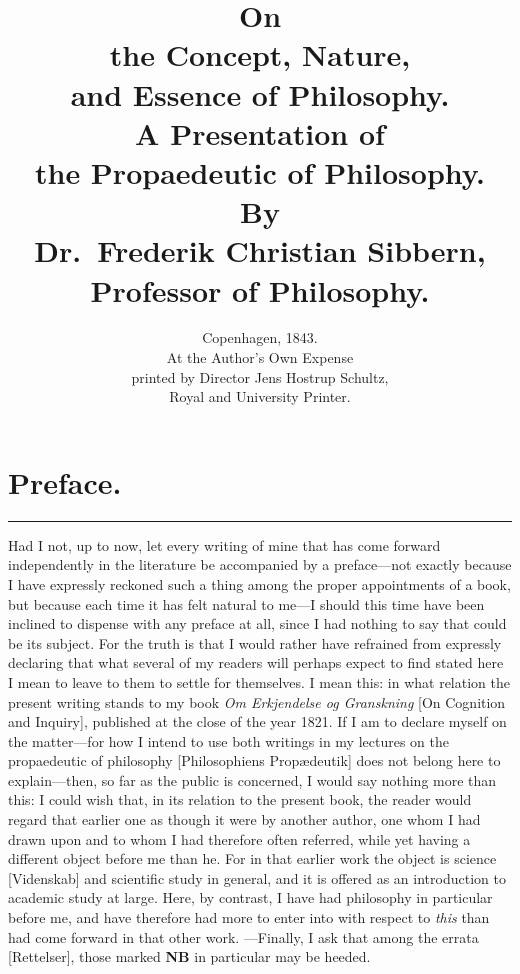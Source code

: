 \documentclass[12pt,a4paper]{book}
\title{\textbf{On}\\[6pt]
  \Huge\textbf{the Concept, Nature,}\\[6pt]
  \LARGE\textbf{and Essence of Philosophy.}\\[14pt]
  \normalsize A Presentation of\\[4pt]
  \Large\textbf{the Propaedeutic of Philosophy.}\\[16pt]
  \normalsize By\\[6pt]
  \large Dr.\ Frederik Christian Sibbern,\\[4pt]
  \normalsize Professor of Philosophy.}
\author{}
\date{Copenhagen, 1843.\\
  At the Author's Own Expense\\
  printed by Director Jens Hostrup Schultz,\\
  Royal and University Printer.}
\begin{document}
\maketitle
\thispagestyle{empty}
\cleardoublepage

\chapter*{Preface.}

\begin{center}\rule{0.28\linewidth}{0.4pt}\end{center}

Had I not, up to now, let every writing of mine that has come forward
independently in the literature be accompanied by a preface---not exactly
because I have expressly reckoned such a thing among the proper appointments of
a book, but because each time it has felt natural to me---I should this time
have been inclined to dispense with any preface at all, since I had nothing to
say that could be its subject. For the truth is that I would rather have
refrained from expressly declaring that what several of my readers will perhaps
expect to find stated here I mean to leave to them to settle for themselves. I
mean this: in what relation the present writing stands to my book
\textit{Om Erkjendelse og Granskning} [On Cognition and Inquiry], published at
the close of the year 1821. If I am to declare myself on the matter---for how I
intend to use both writings in my lectures on the propaedeutic of philosophy
[Philosophiens Propædeutik] does not belong here to explain---then, so far as
the public is concerned, I would say nothing more than this: I could wish that,
in its relation to the present book, the reader would regard that earlier one
as though it were by another author, one whom I had drawn upon and to whom I had
therefore often referred, while yet having a different object before me than he.
For in that earlier work the object is science [Videnskab] and scientific study
in general, and it is offered as an introduction to academic study at large.
Here, by contrast, I have had philosophy in particular before me, and have
therefore had more to enter into with respect to \emph{this} than had come
forward in that other work. ---Finally, I ask that among the errata [Rettelser],
those marked \textbf{NB} in particular may be heeded.
\end{document}
